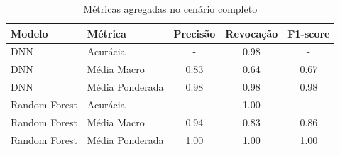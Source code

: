 \begin{table}[H]
  \centering
  \small
  \begin{tabular}{llccc}
    \hline
    \textbf{Modelo} & \textbf{Métrica} & \textbf{Precisão} & \textbf{Revocação} & \textbf{F1-score} \\
    \hline
    DNN             & Acurácia         & -                 & 0.98               & -                 \\
    DNN             & Média Macro      & 0.83              & 0.64               & 0.67              \\
    DNN             & Média Ponderada  & 0.98              & 0.98               & 0.98              \\
    \hline
    Random Forest   & Acurácia         & -                 & 1.00               & -                 \\
    Random Forest   & Média Macro      & 0.94              & 0.83               & 0.86              \\
    Random Forest   & Média Ponderada  & 1.00              & 1.00               & 1.00              \\
    \hline
  \end{tabular}
  \caption{Métricas agregadas no cenário completo}
  \label{tab:total_completo_metricas}
\end{table}